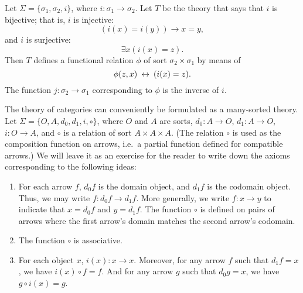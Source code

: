 \begin{example} Let $\Sigma = \{ \sigma _1,\sigma _2,i\}$, where
  $i:\sigma _1\to\sigma _2$.  Let $T$ be the theory that says that $i$
  is bijective; that is, $i$ is injective:
  \[ (i(x)=i(y))\to x=y ,\] and $i$ is surjective:
  \[ \exists x(i(x)=z) .\] Then $T$ defines a functional relation
  $\phi$ of sort $\sigma _2\times \sigma _1$ by means of
  \[ \phi (z,x) \: \leftrightarrow \: (i(x)=z) .\] The function
  $j:\sigma _2\to\sigma _1$ corresponding to $\phi$ is the inverse of
  $i$.  \end{example}



\begin{example} \label{ex-cats} The theory of categories can
  conveniently be formulated as a many-sorted theory.  Let
  $\Sigma = \{O,A,d_0,d_1,i,\circ \}$, where $O$ and $A$ are sorts,
  $d_0:A\to O$, $d_1:A\to O$, $i:O\to A$, and $\circ$ is a relation of
  sort $A\times A\times A$.  (The relation $\circ$ is used as the
  composition function on arrows, i.e.\ a partial function defined for
  compatible arrows.)  We will leave it as an exercise for the reader
  to write down the axioms corresponding to the following ideas:
  \begin{enumerate}
  \item For each arrow $f$, $d_0f$ is the domain object, and $d_1f$ is
    the codomain object.  Thus, we may write $f:d_0f\to d_1f$.  More
    generally, we write $f:x\to y$ to indicate that $x=d_0f$ and
    $y=d_1f$.  The function $\circ$ is defined on pairs of arrows
    where the first arrow's domain matches the second arrow's
    codomain.
  \item The function $\circ$ is associative.
  \item For each object $x$, $i(x):x\to x$.  Moreover, for any arrow
    $f$ such that $d_1f=x$, we have $i(x)\circ f=f$.  And for any
    arrow $g$ such that $d_0g=x$, we have $g\circ
    i(x)=g$.  \end{enumerate} \end{example}




